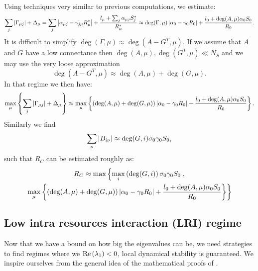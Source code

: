 \documentclass[12pt, titlepage]{report}
\begin{document}
\noindent Using techniques very similar to previous computations, we estimate:
\begin{equation}
\sum_j \left|{\Gamma_{\mu j}}\right|+\Delta_\mu = \sum_j \left|{\alpha_{\mu j}-\gamma_{j\mu}R^*_\mu}\right|+\frac{l_\mu+\sum_j\alpha_{\mu j} S^*_j}{R^*_\mu} \approx \deg(\Gamma, \mu)\left|{\alpha_0 - \gamma_0 R_0}\right|+\frac{l_0+\deg(A,\mu)\alpha_0 S_0}{R_0}.
\end{equation}
It is difficult to simplify $\deg(\Gamma, \mu) \approx \deg(A-G^T, \mu)$. If we assume that $A$ and $G$ have a low connectance then $\deg(A, \mu), \deg(G^T, \mu) \ll N_S$ and we may use the very loose approximation
\begin{equation}
\deg(A-G^T, \mu) \approx \deg(A, \mu)+\deg(G, \mu).
\end{equation}
In that regime we then have:
\begin{equation}
\max_\mu\left\{\sum_j \left|{\Gamma_{\mu j}}\right|+\Delta_\mu\right\} \approx \max_\mu\left\{\left(\deg(A, \mu)+\deg(G, \mu)\right)\left|{\alpha_0-\gamma_0 R_0}\right|+\frac{l_0+\deg(A,\mu)\alpha_0 S_0}{R_0}\right\}.
\end{equation}
Similarly we find
\begin{equation}
\sum_\nu \left|{B_{i\nu}}\right| \approx \deg(G, i) \sigma_0 \gamma_0 S_0,
\end{equation}
such that $R_C$ can be estimated roughly as:
\begin{multline}
R_C \approx \max\left\{ \max_i\left(\deg(G,i)\right) \sigma_0 \gamma_0 S_0 \right., \\
 \left.\max_\mu\left\{\left(\deg(A, \mu)+\deg(G, \mu)\right)\left|{\alpha_0-\gamma_0 R_0}\right|+\frac{l_0+\deg(A,\mu)\alpha_0 S_0}{R_0}\right\}\right\} \label{eq: estimate R_C metaparameters}
\end{multline}


\subsection{Low intra resources interaction (LRI) regime }
Now that we have a bound on how big the eigenvalues can be, we need strategies to find regimes where we  $\text{Re}\left(\lambda_1\right) < 0 $, \ie local dynamical stability is guaranteed. We inspire ourselves from the general idea of the mathematical proofs of \cite{butler_stability_2018}.
\end{document}
